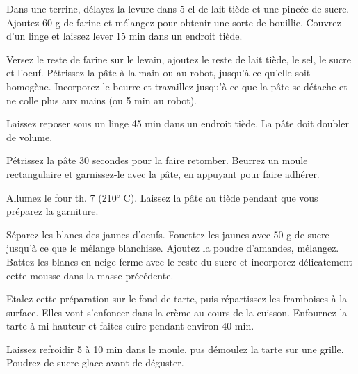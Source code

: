 \begin{etapes}
\item  Dans une terrine, d\'elayez la levure dans 5 cl de lait ti\`ede et une pinc\'ee de sucre. Ajoutez 60 g de farine et m\'elangez pour obtenir une sorte de bouillie. Couvrez d’un linge et laissez lever 15 min dans un endroit ti\`ede.
\item  Versez le reste de farine sur le levain, ajoutez le reste de lait ti\`ede, le sel, le sucre et l’oeuf. P\'etrissez la p\^ate à la main ou au robot, jusqu’à ce qu’elle soit homog\`ene. Incorporez le beurre et travaillez jusqu’à ce que la p\^ate se d\'etache et ne colle plus aux mains (ou 5 min au robot).
\item Laissez reposer sous un linge 45 min dans un endroit ti\`ede. La p\^ate doit doubler de volume.
\item  P\'etrissez la p\^ate 30 secondes pour la faire retomber. Beurrez un moule rectangulaire et garnissez-le avec la p\^ate, en appuyant pour faire adh\'erer.
\item  Allumez le four th. 7 (210° C). Laissez la p\^ate au ti\`ede pendant que vous pr\'eparez la garniture.
\item  S\'eparez les blancs des jaunes d’oeufs. Fouettez les jaunes avec 50 g de sucre jusqu’à ce que le m\'elange blanchisse. Ajoutez la poudre d’amandes, m\'elangez. Battez les blancs en neige ferme avec le reste du sucre et incorporez d\'elicatement cette mousse dans la masse pr\'ec\'edente.
\end{etapes}
\begin{etapes}
\item  Etalez cette pr\'eparation sur le fond de tarte, puis r\'epartissez les framboises à la surface. Elles vont s’enfoncer dans la cr\`eme au cours de la cuisson. Enfournez la tarte à mi-hauteur et faites cuire pendant environ 40 min.
\item  Laissez refroidir 5 à 10 min dans le moule, pus d\'emoulez la tarte sur une grille. Poudrez de sucre glace avant de d\'eguster. 
\end{etapes}
\begin{conseils}
\end{conseils}

